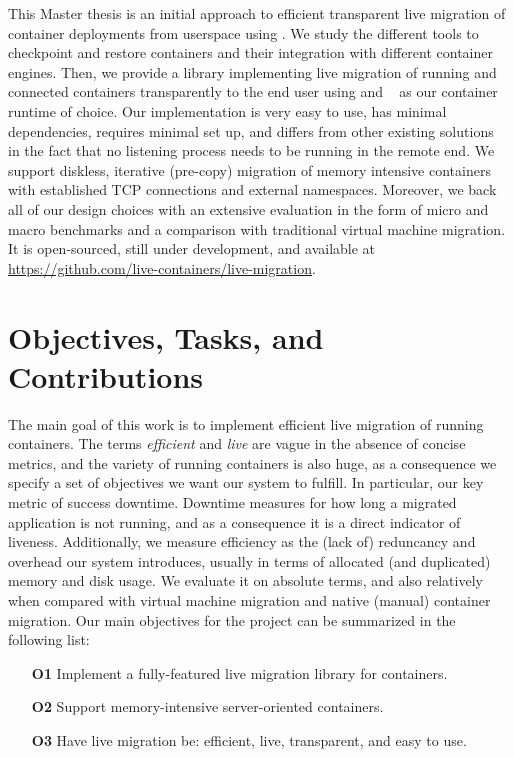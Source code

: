This Master thesis is an initial approach to efficient transparent live migration of container deployments from userspace using \criu.
We study the different tools to checkpoint and restore containers and their integration with different container engines.
Then, we provide a library implementing live migration of running and connected containers transparently to the end user using \criu and \runc~\cite{introducing-runc} as our container runtime of choice.
Our implementation is very easy to use, has minimal dependencies, requires minimal set up, and differs from other existing solutions~\cite{phaul-github} in the fact that no listening process needs to be running in the remote end.
We support diskless, iterative (pre-copy) migration of memory intensive containers with established TCP connections and external namespaces.
Moreover, we back all of our design choices with an extensive evaluation in the form of micro and macro benchmarks and a comparison with traditional virtual machine migration.
It is open-sourced, still under development, and available at \url{https://github.com/live-containers/live-migration}.

\section{Objectives, Tasks, and Contributions}

The main goal of this work is to implement efficient live migration of running containers.
The terms \textit{efficient} and \textit{live} are vague in the absence of concise metrics, and the variety of running containers is also huge, as a consequence we specify a set of objectives we want our system to fulfill.
In particular, our key metric of success downtime.
Downtime measures for how long a migrated application is not running, and as a consequence it is a direct indicator of liveness.
Additionally, we measure efficiency as the (lack of) reduncancy and overhead our system introduces, usually in terms of allocated (and duplicated) memory and disk usage.
We evaluate it on absolute terms, and also relatively when compared with virtual machine migration and native (manual) container migration.
Our main objectives for the project can be summarized in the following list:
\begin{itemize}
    \item[\textbf{O1}] Implement a fully-featured live migration library for containers.
    \item[\textbf{O2}] Support memory-intensive server-oriented containers.
    \item[\textbf{O3}] Have live migration be: efficient, live, transparent, and easy to use.
\end{itemize}

